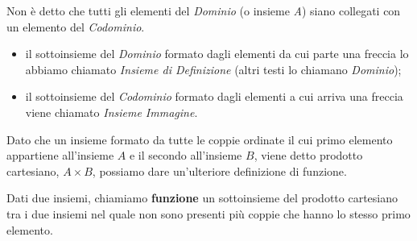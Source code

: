 Non è detto che tutti gli elementi del \emph{Dominio} (o insieme \emph{A}) 
siano collegati con un elemento del \emph{Codominio}.
\begin{itemize}[nosep]
\item il sottoinsieme del \emph{Dominio} formato dagli elementi da cui parte 
una freccia lo abbiamo chiamato \emph{Insieme di Definizione} 
(altri testi lo chiamano \emph{Dominio});
\item il sottoinsieme del \emph{Codominio} formato dagli elementi a cui 
arriva una freccia viene chiamato \emph{Insieme Immagine}.
\end{itemize}

Dato che un insieme formato da tutte le coppie ordinate il cui primo elemento 
appartiene all'insieme \(A\) e il secondo all'insieme \(B\), viene detto 
prodotto cartesiano, \(A \times B\),
possiamo dare un'ulteriore definizione di funzione.

\begin{definizione}
Dati due insiemi, chiamiamo \textbf{funzione} 
un sottoinsieme del prodotto cartesiano tra i due insiemi nel quale non sono 
presenti più coppie che hanno lo stesso primo elemento.
\end{definizione}


